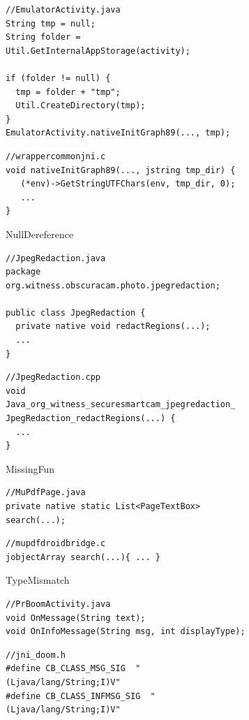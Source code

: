 \begin{figure}[t]
  \centering
  \vspace{2mm}
  \begin{subfigure}[t]{0.5\textwidth}
    \begin{lstlisting}[style=java,xleftmargin=2.5em]
//EmulatorActivity.java
String tmp = null;
String folder = Util.GetInternalAppStorage(activity);

if (folder != null) {
  tmp = folder + "tmp";
  Util.CreateDirectory(tmp);
}
EmulatorActivity.nativeInitGraph89(..., tmp);
    \end{lstlisting}
    \begin{lstlisting}[style=cpp,xleftmargin=2.5em]
//wrappercommonjni.c
void nativeInitGraph89(..., jstring tmp_dir) {
   (*env)->GetStringUTFChars(env, tmp_dir, 0);
   ...
}
    \end{lstlisting}
    \vspace*{-.5em}
    \caption{NullDereference}
    \label{fig:bug1}
  \end{subfigure}
  \begin{subfigure}[t]{0.5\textwidth}
    \begin{lstlisting}[style=java,xleftmargin=2.5em]
//JpegRedaction.java
package org.witness.obscuracam.photo.jpegredaction;

public class JpegRedaction {
  private native void redactRegions(...);
  ...
}
    \end{lstlisting}
    \begin{lstlisting}[style=cpp,xleftmargin=2.5em]
//JpegRedaction.cpp
void
Java_org_witness_securesmartcam_jpegredaction_ JpegRedaction_redactRegions(...) {
  ...
}
    \end{lstlisting}
    \vspace*{-.5em}
    \caption{MissingFun}
    \label{fig:bug2}
  \end{subfigure}
  \begin{subfigure}[t]{0.5\textwidth}
    \begin{lstlisting}[style=java,xleftmargin=2.5em]
//MuPdfPage.java
private native static List<PageTextBox> search(...);
    \end{lstlisting}
    \begin{lstlisting}[style=cpp,xleftmargin=2.5em]
//mupdfdroidbridge.c
jobjectArray search(...){ ... }
    \end{lstlisting}
    \vspace*{-.5em}
    \caption{TypeMismatch}
    \label{fig:bug3}
  \end{subfigure}
  \begin{subfigure}[t]{0.5\textwidth}
    \begin{lstlisting}[style=java,xleftmargin=2.5em]
//PrBoomActivity.java
void OnMessage(String text);
void OnInfoMessage(String msg, int displayType);
    \end{lstlisting}
    \begin{lstlisting}[style=cpp,xleftmargin=2.5em]
//jni_doom.h
#define CB_CLASS_MSG_SIG  "(Ljava/lang/String;I)V"
#define CB_CLASS_INFMSG_SIG  "(Ljava/lang/String;I)V"


\end{lstlisting}
\end{subfigure}
\end{figure}
